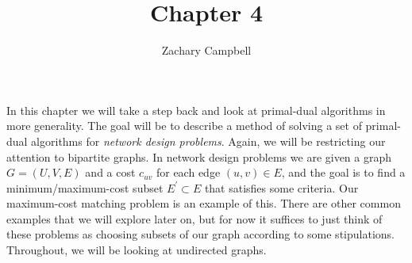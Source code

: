 \documentclass[11pt]{article}
\renewcommand{\'}{^{'}}
\begin{document}
\title{Chapter 4}
\author{Zachary Campbell}

\maketitle
	In this chapter we will take a step back and look at primal-dual algorithms in more generality. 
	The goal will be to describe a method of solving a set of primal-dual algorithms for 
	\emph{network design problems}. Again, we will be restricting our attention to bipartite 
	graphs. In network design problems we are given a graph $G = (U,V,E)$ 
	and a cost $c_{uv}$ for each edge $(u,v)\in E$, and the goal is to find a minimum/maximum-cost 
	subset 
	$E\' \subset E$ that satisfies some criteria. Our maximum-cost matching problem is an example
	of this. There are other common examples that we will explore later on, but for now it suffices 
	to just think of these problems as choosing subsets of our graph according to some 
	stipulations. Throughout, we will be looking at undirected graphs.
\end{document}
